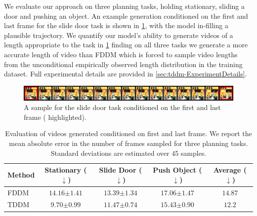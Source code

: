 We evaluate our approach on three planning tasks, holding stationary, sliding a door and pushing an object. An example generation conditioned on the first and last frame for the slide door task is shown in \cref{fig:tddm-video_example}, with the model in-filling a plausible trajectory. We quantify our model's ability to generate videos of a length appropriate to the task in \cref{tab:video_results} finding on all three tasks we generate a more accurate length of video than FDDM which is forced to sample video lengths from the unconditional empirically observed length distribution in the training dataset. Full experimental details are provided in \cref{sec:tddm-ExperimentDetails}.


\begin{figure}[t]
    \centering
    \includegraphics[width=\textwidth]{figs/tddm/21-1-padded_red_big.png}
    \caption{A sample for the slide door task conditioned on the first and last frame ({\color{red} highlighted}).}
    \label{fig:tddm-video_example}
\end{figure}

\begin{table}[t]
     \centering
   \caption{Evaluation of videos generated conditioned on first and last frame. We report the mean absolute error in the number of frames sampled
   for three planning tasks. Standard deviations are estimated over 45 samples.}
   \begin{tabular}{@{}lcccc@{}}
     \toprule
     Method & Stationary ($\downarrow$) & Slide Door ($\downarrow$) & Push Object ($\downarrow$) & Average ($\downarrow$)   \\ \midrule
     FDDM & $14.16 {\scriptstyle \pm 1.41}$ & $13.39 {\scriptstyle \pm 1.34}$ & $17.06 {\scriptstyle \pm 1.47}$ & $14.87$ \\
     TDDM & $\mathbf{9.70 {\scriptstyle \pm 0.99}}$ & $\mathbf{11.47 {\scriptstyle \pm 0.74}}$ & $\mathbf{15.43 {\scriptstyle \pm 0.90}}$ & $\mathbf{12.2}$ \\ \bottomrule
   \end{tabular}
   \label{tab:video_results}
\end{table}


